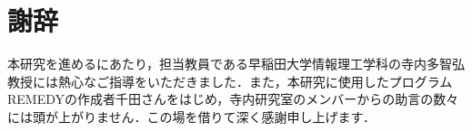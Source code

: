 \documentclass[a4paper, 12pt, dvipdfmx, uplatex]{jsreport}
\begin{document}
\chapter*{謝辞}
本研究を進めるにあたり，担当教員である早稲田大学情報理工学科の寺内多智弘教授には熱心なご指導をいただきました．また，本研究に使用したプログラムREMEDYの作成者千田さんをはじめ，寺内研究室のメンバーからの助言の数々には頭が上がりません．この場を借りて深く感謝申し上げます．
\end{document}
